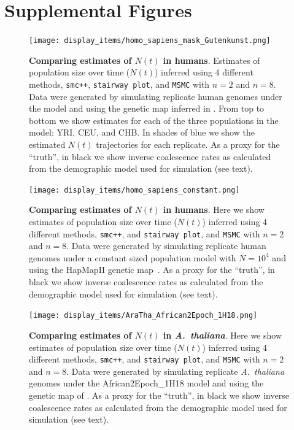 \documentclass[12pt,halfline,a4paper]{ouparticle}
\newcommand{\beginsupplement}{%
        \setcounter{table}{0}
        \renewcommand{\thetable}{S\arabic{table}}%
        \renewcommand{\theHtable}{S\thetable}
        \setcounter{figure}{0}
        \renewcommand{\thefigure}{S\arabic{figure}}%
        \renewcommand{\theHfigure}{S\thefigure}
     }
\newcommand{\MSMC}{\texttt{MSMC}\xspace}
\newcommand{\smcpp}{\texttt{smc++}\xspace}
\newcommand{\stairwayplot}{\texttt{stairway plot}\xspace}
\begin{document}



\pagebreak
\beginsupplement
\section*{Supplemental Figures}
\begin{figure}
\begin{center}
\texttt{[image: display\_items/homo\_sapiens\_mask\_Gutenkunst.png]}
\caption{\textbf{Comparing estimates of $N(t)$ in humans}. Estimates of population
size over time ($N(t)$) inferred using 4 different methods, \smcpp, \stairwayplot, and
\MSMC with $n=2$ and $n=8$. Data were generated by simulating
replicate human genomes under the \cite{gutenkunst2009inferring} model and using the genetic map
inferred in \cite{international2007second}. From top to bottom we show estimates for each
of the three populations in the model: YRI, CEU, and CHB. In shades of blue we show the estimated
$N(t)$ trajectories for each replicate.
As a proxy for the ``truth'', in black we show inverse coalescence rates
as calculated from the demographic model used for simulation (see text).
}
\label{fig:n_t_gutenkunst}
\end{center}
\end{figure}

\begin{figure}
\begin{center}
\texttt{[image: display\_items/homo\_sapiens\_constant.png]}
\caption{\textbf{Comparing estimates of $N(t)$ in humans}. Here we show estimates of population
size over time ($N(t)$) inferred using 4 different methods, \smcpp, and \texttt{stairway plot}, and
\MSMC with $n=2$ and $n=8$. Data were generated by simulating
replicate human genomes under a constant sized population model with $N=10^4$ and using the
HapMapII genetic map~\citep{international2007second}.
As a proxy for the ``truth'', in black we show inverse coalescence rates
as calculated from the demographic model used for simulation (see text).
}
\label{fig:n_t_HomSap_constant}
\end{center}
\end{figure}

\begin{figure}
\begin{center}
\texttt{[image: display\_items/AraTha\_African2Epoch\_1H18.png]}
\caption{\textbf{Comparing estimates of $N(t)$ in \textit{A.~thaliana}}. Here we show estimates of population
size over time ($N(t)$) inferred using 4 different methods, \smcpp, and \texttt{stairway plot}, and
\MSMC with $n=2$ and $n=8$. Data were generated by simulating
replicate \textit{A.~thaliana} genomes under the African2Epoch\_1H18 model and using
the genetic map of \cite{salome2011recombination}.
As a proxy for the ``truth'', in black we show inverse coalescence rates
as calculated from the demographic model used for simulation (see text).
}
\label{fig:n_t_AraTha}
\end{center}
\end{figure}
\end{document}
